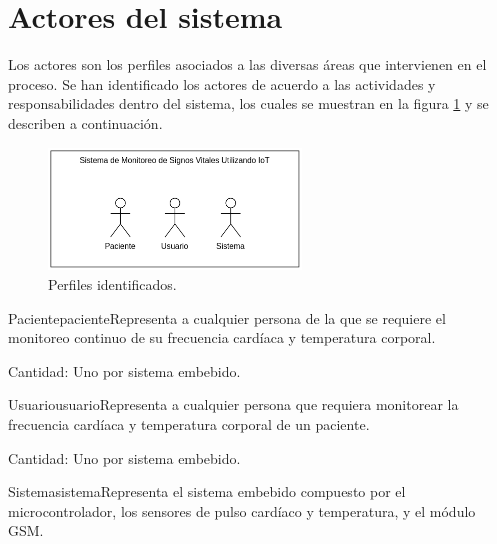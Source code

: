 \section{Actores del sistema}

Los actores son los perfiles asociados a las diversas áreas que intervienen en el proceso. Se han identificado los actores de acuerdo a las actividades y responsabilidades dentro del sistema, los cuales se muestran en la figura \ref{fig:perfiles} y se describen a continuación.


    \begin{figure}[htbp!]
      \begin{center}
      \includegraphics[width=0.6\textwidth]{ModeloComportamiento/imagenes/Actores.png}
      \caption{Perfiles identificados.}
      \label{fig:perfiles}
      \end{center}
    \end{figure}

\begin{actor}{Paciente}{paciente}{Representa a cualquier persona de la que se requiere el monitoreo continuo de su frecuencia cardíaca y temperatura corporal.}

	\item[Cantidad:] Uno por sistema embebido.

\end{actor}

\begin{actor}{Usuario}{usuario}{Representa a cualquier persona que requiera monitorear la frecuencia cardíaca y temperatura corporal de un paciente.}
	
	\item[Cantidad:] Uno por sistema embebido.
	
\end{actor}

\begin{actor}{Sistema}{sistema}{Representa el sistema embebido compuesto por el microcontrolador, los sensores de pulso cardíaco y temperatura, y el módulo GSM.}
	
\end{actor}